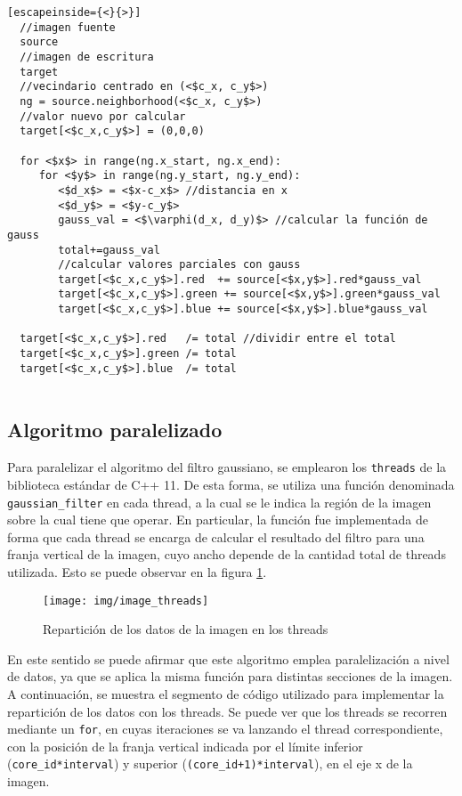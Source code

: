 \documentclass {article}
\begin{document}
\begin{lstlisting}[escapeinside={<}{>}]
  //imagen fuente
  source
  //imagen de escritura
  target
  //vecindario centrado en (<$c_x, c_y$>)
  ng = source.neighborhood(<$c_x, c_y$>) 
  //valor nuevo por calcular
  target[<$c_x,c_y$>] = (0,0,0)

  for <$x$> in range(ng.x_start, ng.x_end):
     for <$y$> in range(ng.y_start, ng.y_end):
        <$d_x$> = <$x-c_x$> //distancia en x
        <$d_y$> = <$y-c_y$>
        gauss_val = <$\varphi(d_x, d_y)$> //calcular la función de gauss
        total+=gauss_val
        //calcular valores parciales con gauss
        target[<$c_x,c_y$>].red  += source[<$x,y$>].red*gauss_val 
        target[<$c_x,c_y$>].green += source[<$x,y$>].green*gauss_val
        target[<$c_x,c_y$>].blue += source[<$x,y$>].blue*gauss_val
  
  target[<$c_x,c_y$>].red   /= total //dividir entre el total
  target[<$c_x,c_y$>].green /= total
  target[<$c_x,c_y$>].blue  /= total
        
\end{lstlisting}

\subsection{Algoritmo paralelizado}
Para paralelizar el algoritmo del filtro gaussiano, se emplearon los \texttt{threads} de la
biblioteca estándar de C++ 11.  %
De esta forma, se utiliza una función denominada
\texttt{gaussian\_filter} en cada thread, a la cual se le indica la región de la imagen sobre la
cual tiene que operar. En particular, la función fue implementada de forma que cada thread se
encarga de calcular el resultado del filtro para una franja vertical de la imagen, cuyo ancho
depende de la cantidad total de threads utilizada. Esto se puede observar en la figura
\ref{fig:image_threads}.


\begin{figure}[ht]
  \centering
  \texttt{[image: img/image\_threads]}
  \caption{\label{fig:image_threads}Repartición de los datos de la imagen en los threads}
\end{figure}

En este sentido se puede afirmar que este algoritmo emplea paralelización a nivel de datos, ya que
se aplica la misma función para distintas secciones de la imagen. A continuación, se muestra el
segmento de código utilizado para implementar la repartición de los datos con los threads. Se puede
ver que los threads se recorren mediante un \texttt{for}, en cuyas iteraciones se va lanzando el
thread correspondiente, con la posición de la franja vertical indicada por el límite inferior
(\texttt{core\_id*interval}) y superior (\texttt{(core\_id+1)*interval}), en el eje x de la imagen.
\end{document}
